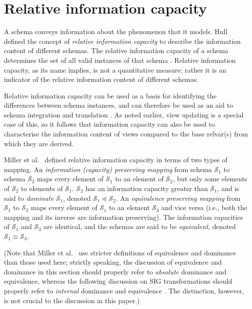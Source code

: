\documentclass{sig-alternate-05-2015}
\newcommand{\SC}[1]{\ensuremath{\mathcal{S}_{#1}}}
\newcommand{\Dominates}[2]{\ensuremath{#2 \preceq #1}}
\newcommand{\Equivalent}[2]{\ensuremath{#1 \equiv #2}}
\begin{document}


\section{Relative information capacity}
\label{sec-info-capacity}

\noindent A schema conveys information about the phenomenon that it models. Hull \cite{Hull.R-1986a-Relative} defined the concept of \emph{relative information capacity} to describe the information content of different schemas. The relative information capacity of a schema determines the set of all valid instances of that schema \cite{Hull.R-1986a-Relative,Miller.R-1994a-PhD,Miller.R-1993a-Information}. Relative information capacity, as its name implies, is not a quantitative measure; rather it is an indicator of the relative information content of different schemas.

Relative information capacity can be used as a basis for identifying the differences between schema instances, and can therefore be used as an aid to schema integration and translation \cite{Miller.R-1994a-PhD}. As noted earlier, view updating is a special case of this, so it follows that information capacity can also be used to characterise the information content of views compared to the base relvar(s) from which they are derived.

Miller et al.\ \cite{Miller.R-1993a-Information} defined relative information capacity in terms of two types of mapping. An \emph{information (capacity) preserving mapping} from schema \(\SC{1}\) to schema \(\SC{2}\) maps every element of \(\SC{1}\) to an element of \(\SC{2}\), but only some elements of \(\SC{2}\) to elements of \(\SC{1}\). \(\SC{2}\) has an information capacity greater than \(\SC{1}\), and is said to \emph{dominate} \(\SC{1}\), denoted \Dominates{\SC{2}}{\SC{1}}. An \emph{equivalence preserving mapping} from \(\SC{1}\) to \(\SC{3}\) maps every element of \(\SC{1}\) to an element \(\SC{3}\) and vice versa (i.e., both the mapping and its inverse are information preserving). The information capacities of \(\SC{1}\) and \(\SC{3}\) are identical, and the schemas are said to be \emph{equivalent}, denoted \Equivalent{\SC{1}}{\SC{3}}.

(Note that Miller et al.\ \cite{Miller.R-1994a-Schema} use stricter definitions of equivalence and dominance than those used here; strictly speaking, the discussion of equivalence and dominance in this section should properly refer to \emph{absolute} dominance and equivalence, whereas the following discussion on SIG transformations should properly refer to \emph{internal} dominance and equivalence \cite{Miller.R-1994a-Schema}. The distinction, however, is not crucial to the discussion in this paper.)
\end{document}
